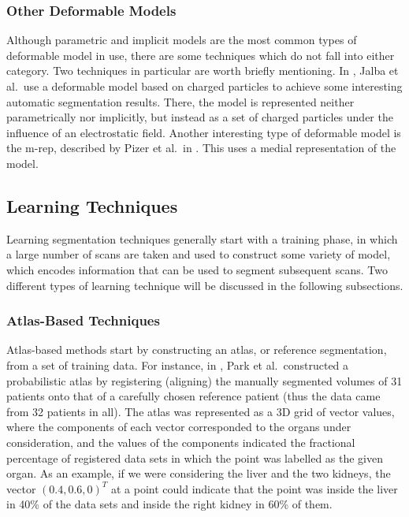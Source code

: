 \subsubsection{Other Deformable Models}

Although parametric and implicit models are the most common types of deformable model in use, there are some techniques which do not fall into either category. Two techniques in particular are worth briefly mentioning. In \cite{jalba04}, Jalba et al.\ use a deformable model based on charged particles to achieve some interesting automatic segmentation results. There, the model is represented neither parametrically nor implicitly, but instead as a set of charged particles under the influence of an electrostatic field. Another interesting type of deformable model is the m-rep, described by Pizer et al.\ in \cite{pizer03}. This uses a medial representation of the model.

\subsection{Learning Techniques}

Learning segmentation techniques generally start with a training phase, in which a large number of scans are taken and used to construct some variety of model, which encodes information that can be used to segment subsequent scans. Two different types of learning technique will be discussed in the following subsections.

\subsubsection{Atlas-Based Techniques}

Atlas-based methods start by constructing an atlas, or reference segmentation, from a set of training data. For instance, in \cite{park03}, Park et al.\ constructed a probabilistic atlas by registering (aligning) the manually segmented volumes of 31 patients onto that of a carefully chosen reference patient (thus the data came from 32 patients in all). The atlas was represented as a 3D grid of vector values, where the components of each vector corresponded to the organs under consideration, and the values of the components indicated the fractional percentage of registered data sets in which the point was labelled as the given organ. As an example, if we were considering the liver and the two kidneys, the vector $(0.4, 0.6, 0)^T$ at a point could indicate that the point was inside the liver in 40\% of the data sets and inside the right kidney in 60\% of them.

